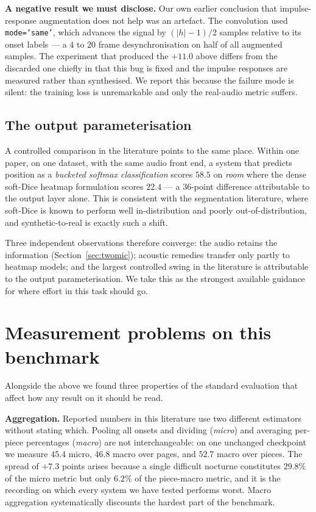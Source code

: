 \documentclass{article}
\begin{document}
\noindent\textbf{A negative result we must disclose.} Our own earlier
conclusion that impulse-response augmentation does not help was an artefact. The
convolution used \texttt{mode='same'}, which advances the signal by
$(\lvert h \rvert - 1)/2$ samples relative to its onset labels --- a
$4$ to $20$ frame desynchronisation on half of all augmented samples. The
experiment that produced the $+11.0$ above differs from the discarded one
chiefly in that this bug is fixed and the impulse responses are measured rather
than synthesised. We report this because the failure mode is silent: the
training loss is unremarkable and only the real-audio metric suffers.

\subsection{The output parameterisation}

A controlled comparison in the literature points to the same place. Within one
paper, on one dataset, with the same audio front end, a system that predicts
position as a \emph{bucketed softmax classification} scores $58.5$ on
\emph{room} where the dense soft-Dice heatmap formulation scores $22.4$ --- a
$36$-point difference attributable to the output layer alone. This is
consistent with the segmentation literature, where soft-Dice is known to
perform well in-distribution and poorly out-of-distribution, and
synthetic-to-real is exactly such a shift.

Three independent observations therefore converge: the audio retains the
information (Section~\ref{sec:twomic}); acoustic remedies transfer only partly
to heatmap models; and the largest controlled swing in the literature is
attributable to the output parameterisation. We take this as the strongest
available guidance for where effort in this task should go.

\section{Measurement problems on this benchmark}
\label{sec:eval}

Alongside the above we found three properties of the standard evaluation that
affect how any result on it should be read.

\noindent\textbf{Aggregation.} Reported numbers in this literature use two
different estimators without stating which. Pooling all onsets and dividing
(\emph{micro}) and averaging per-piece percentages (\emph{macro}) are not
interchangeable: on one unchanged checkpoint we measure $45.4$ micro, $46.8$
macro over pages, and $52.7$ macro over pieces. The spread of $+7.3$ points
arises because a single difficult nocturne constitutes $29.8\%$ of the micro
metric but only $6.2\%$ of the piece-macro metric, and it is the recording on
which every system we have tested performs worst. Macro aggregation
systematically discounts the hardest part of the benchmark.
\end{document}
